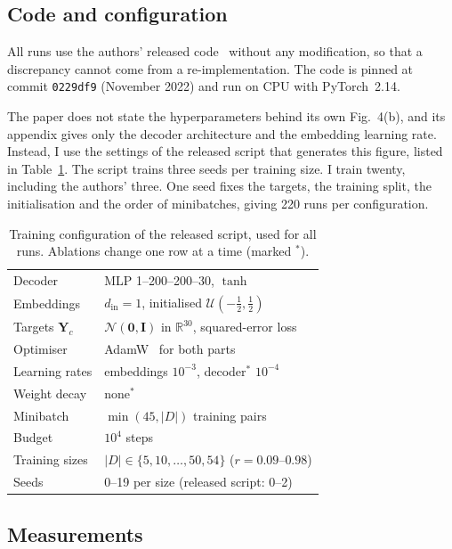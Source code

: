 \subsection{Code and configuration}
\label{sec:config}

All runs use the authors' released code~\cite{liu2022code} without any
modification, so that a discrepancy cannot come from a re-implementation. The
code is pinned at commit \texttt{0229df9} (November 2022) and run on CPU with
PyTorch~2.14.

The paper does not state the hyperparameters behind its own Fig.~4(b), and its
appendix gives only the decoder architecture and the embedding learning rate.
Instead, I use the settings of the released script that generates this
figure, listed in Table~\ref{tab:config}. The script trains three seeds per
training size. I train twenty, including the authors' three. One seed fixes
the targets, the training split, the initialisation and the order of
minibatches, giving 220 runs per configuration.

\begin{table}[t]
  \centering
  \caption{Training configuration of the released script, used for all
  runs. Ablations change one row at a time (marked $^{*}$).}
  \label{tab:config}
  \small
  \begin{tabular}{@{}ll@{}}
    \toprule
    Decoder & MLP 1--200--200--30, $\tanh$ \\
    Embeddings & $d_{\mathrm{in}} = 1$, initialised $\mathcal{U}(-\tfrac12, \tfrac12)$ \\
    Targets $\mathbf{Y}_c$ & $\mathcal{N}(\mathbf{0}, \mathbf{I})$ in $\mathbb{R}^{30}$, squared-error loss \\
    Optimiser & AdamW~\cite{loshchilov2019decoupled} for both parts \\
    Learning rates & embeddings $10^{-3}$, decoder$^{*}$ $10^{-4}$ \\
    Weight decay & none$^{*}$ \\
    Minibatch & $\min(45, |D|)$ training pairs \\
    Budget & $10^4$ steps \\
    Training sizes & $|D| \in \{5, 10, \dots, 50, 54\}$ ($r = 0.09$--$0.98$) \\
    Seeds & 0--19 per size (released script: 0--2) \\
    \bottomrule
  \end{tabular}
\end{table}

\subsection{Measurements}
\label{sec:measure}

